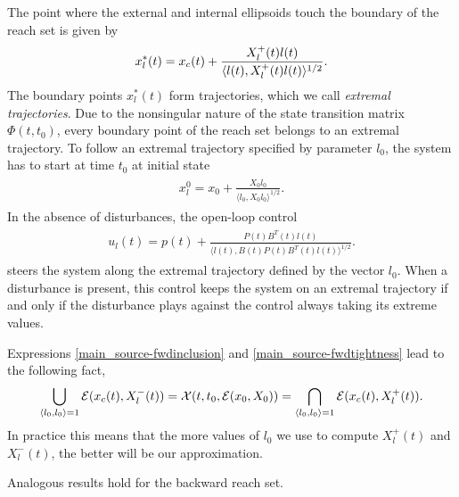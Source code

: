 \documentclass[letterpaper,10pt,english]{sphinxmanual}
\begin{document}
The point where the external and internal ellipsoids touch the boundary
of the reach set is given by
\begin{gather}
\begin{split}x_l^*(t) = x_c(t) +
\frac{X^+_l(t)l(t)}{\langle l(t), X^+_l(t)l(t)\rangle^{1/2}} .\end{split}\notag
\end{gather}
The boundary points $x^*_l(t)$ form trajectories, which we call
\emph{extremal trajectories}. Due to the nonsingular nature of the state
transition matrix $\Phi(t,t_0)$, every boundary point of the reach
set belongs to an extremal trajectory. To follow an extremal trajectory
specified by parameter $l_0$, the system has to start at time
$t_0$ at initial state
\label{main_source:equation-x0lct}\begin{gather}
\begin{split}x^0_l = x_0 + \frac{X_0l_0}{\langle l_0,X_0l_0\rangle^{1/2}}.\end{split}\label{main_source-x0lct}
\end{gather}
In the absence of disturbances, the open-loop control
\label{main_source:equation-uct}\begin{gather}
\begin{split}u_l(t) = p(t) + \frac{P(t)B^T(t)l(t)}{\langle l(t),
B(t)P(t)B^T(t)l(t)\rangle^{1/2}}.\end{split}\label{main_source-uct}
\end{gather}
steers the system along the extremal trajectory defined by the vector
$l_0$. When a disturbance is present, this control keeps the
system on an extremal trajectory if and only if the disturbance plays
against the control always taking its extreme values.

Expressions \eqref{main_source-fwdinclusion} and \eqref{main_source-fwdtightness} lead to the following
fact,
\begin{gather}
\begin{split}\bigcup_{\langle l_0,l_0\rangle=1}{\mathcal E}(x_c(t),X^-_l(t)) =
{\mathcal X}(t,t_0,{\mathcal E}(x_0,X_0)) =
\bigcap_{\langle l_0,l_0\rangle=1}{\mathcal E}(x_c(t),X^+_l(t)).\end{split}\notag
\end{gather}
In practice this means that the more values of $l_0$ we use to
compute $X^+_l(t)$ and $X^-_l(t)$, the better will be our
approximation.

Analogous results hold for the backward reach set.
\end{document}
